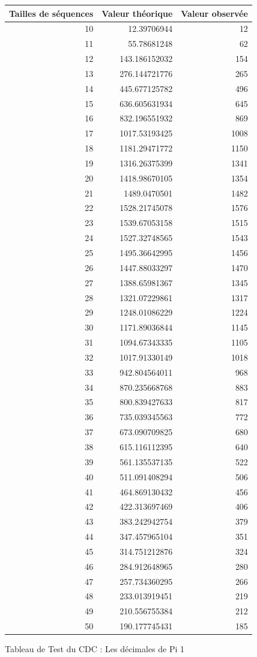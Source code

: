 \documentclass[french]{article}
\begin{document}
\begin{figure}[h]
	\centering
	\begin{tabular}{|r|r|r|}
		\hline
		Tailles de séquences & Valeur théorique & Valeur observée\\
		\hline
		10 & 12.39706944 & 12\\
		11 & 55.78681248 & 62\\
		12 & 143.186152032 & 154\\
		13 & 276.144721776 & 265\\
		14 & 445.677125782 & 496\\
		15 & 636.605631934 & 645\\
		16 & 832.196551932 & 869\\
		17 & 1017.53193425 & 1008\\
		18 & 1181.29471772 & 1150\\
		19 & 1316.26375399 & 1341\\
		20 & 1418.98670105 & 1354\\
		21 & 1489.0470501 & 1482\\
		22 & 1528.21745078 & 1576\\
		23 & 1539.67053158 & 1515\\
		24 & 1527.32748565 & 1543\\
		25 & 1495.36642995 & 1456\\
		26 & 1447.88033297 & 1470\\
		27 & 1388.65981367 & 1345\\
		28 & 1321.07229861 & 1317\\
		29 & 1248.01086229 & 1224\\
		30 & 1171.89036844 & 1145\\
		31 & 1094.67343335 & 1105\\
		32 & 1017.91330149 & 1018\\
		33 & 942.804564011 & 968\\
		34 & 870.235668768 & 883\\
		35 & 800.839427633 & 817\\
		36 & 735.039345563 & 772\\
		37 & 673.090709825 & 680\\
		38 & 615.116112395 & 640\\
		39 & 561.135537135 & 522\\
		40 & 511.091408294 & 506\\
		41 & 464.869130432 & 456\\
		42 & 422.313697469 & 406\\
		43 & 383.242942754 & 379\\
		44 & 347.457965104 & 351\\
		45 & 314.751212876 & 324\\
		46 & 284.912648965 & 280\\
		47 & 257.734360295 & 266\\
		48 & 233.013919451 & 219\\
		49 & 210.556755384 & 212\\
		50 & 190.177745431 & 185\\
		\hline
	\end{tabular}
	\caption{Tableau de Test du CDC : Les décimales de Pi 1}
\end{figure}
\end{document}
